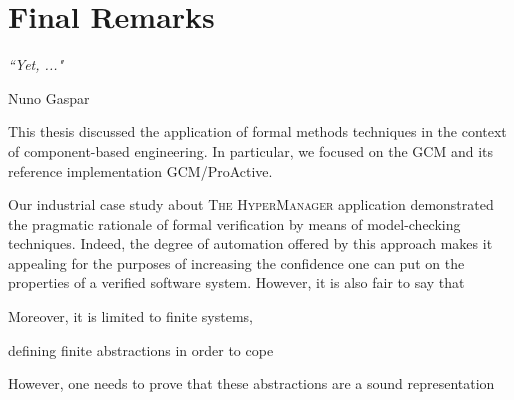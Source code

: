 
\chapter{Final Remarks} 
\label{chap:conclusion} 

\epigraph{\textit{“Yet, ..."}}{Nuno Gaspar}



\minitoc





	This thesis discussed the application of formal methods techniques in the context of 
	component-based engineering. In particular, we focused on the \ac{GCM} and its reference 
	implementation GCM/ProActive.    	

	Our industrial case study about 
	\textsc{The HyperManager} application demonstrated the pragmatic rationale of
	formal verification by means of model-checking techniques. Indeed, the degree of automation
	offered by this approach makes it appealing for the purposes of increasing the confidence
	one can put on the properties of a verified software system. However, it is also fair to say that
	
	Moreover, it is limited to finite systems,
	
	defining finite abstractions in order to cope
	
	However, one needs to prove that these abstractions are a sound representation
	


